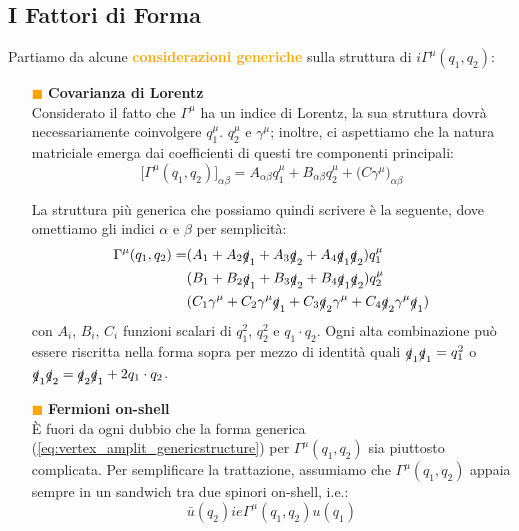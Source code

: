 \documentclass[../main.tex]{subfiles}
\begin{document}
\subsection{I Fattori di Forma}
Partiamo da alcune \textcolor{Orange}{\textbf{considerazioni generiche}} sulla struttura di $i\Gamma^\mu(q_1,q_2)$:
\begin{itemize}
    \item[\textcolor{Orange}{$\blacksquare$}] \textbf{Covarianza di Lorentz}\\
        Considerato il fatto che $\Gamma^\mu$ ha un indice di Lorentz, la sua struttura dovrà necessariamente coinvolgere $q_1^\mu$. $q_2^\mu$ e $\gamma^\mu$; inoltre, ci aspettiamo che la natura matriciale emerga dai coefficienti di questi tre componenti principali:
        \[
        \bigl[\Gamma^\mu(q_1,q_2)\bigr]_{\alpha\beta} = A_{\alpha\beta}q_1^\mu + B_{\alpha\beta}q_2^\mu + \bigl(C\gamma^\mu\bigr)_{\alpha\beta}
        \]

        La struttura più generica che possiamo quindi scrivere è la seguente, dove omettiamo gli indici $\alpha$ e $\beta$ per semplicità:
        \begin{equation}
            \begin{aligned}
            \Gamma^\mu(q_1,q_2) = & (A_1 + A_2\slashed q_1 + A_3\slashed q_2 + A_4\slashed q_1 \slashed q_2)q_1^\mu\\
                                  & (B_1 + B_2\slashed q_1 + B_3\slashed q_2 + B_4\slashed q_1 \slashed q_2)q_2^\mu\\
                                  & (C_1\gamma^\mu + C_2\gamma^\mu\slashed q_1 + C_3\slashed q_2\gamma^\mu + C_4\slashed q_2 \gamma^\mu \slashed q_1)
            \end{aligned}
            \label{eq:vertex_amplit_genericstructure}
        \end{equation}
        con $A_i$, $B_i$, $C_i$ funzioni scalari di $q_1^2$, $q_2^2$ e $q_1\cdot q_2$. Ogni alta combinazione può essere riscritta nella forma sopra per mezzo di identità quali $\slashed q_1\slashed q_1 = q_1^2$ o $\slashed q_1\slashed q_2 = \slashed q_2\slashed q_1 + 2q_1\cdot q_2$.
        
    \item[\textcolor{Orange}{$\blacksquare$}] \textbf{Fermioni on-shell}\\
        È fuori da ogni dubbio che la forma generica (\ref{eq:vertex_amplit_genericstructure}) per $\Gamma^\mu(q_1,q_2)$ sia piuttosto complicata. Per semplificare la trattazione, assumiamo che $\Gamma^\mu(q_1,q_2)$ appaia sempre in un sandwich tra due spinori on-shell, i.e.: 
        \begin{equation}
            \bar u(q_2) ie\Gamma^\mu(q_1,q_2) u(q_1)
            \label{eq:vertex_sandwich}
        \end{equation}


\end{itemize}
\end{document}
